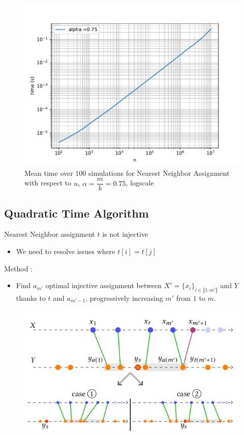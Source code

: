 \documentclass[11pt]{beamer}
\begin{document}
\begin{frame}
\begin{figure}[H]
\centering
\includegraphics[scale=0.48]{t_time.pdf}
\caption{Mean time over $100$ simulations for Nearest Neighbor Assignment with respect to $n$, $\alpha=\dfrac{m}{b}=0.75$, logscale}\label{t_time}
\end{figure}
\end{frame}

\subsection{Quadratic Time Algorithm}

\begin{frame}

Nearest Neighbor assignment $t$ is {\color{red}not injective} 
\begin{itemize}
\item We need to resolve issues where $t[i]=t[j]$
\end{itemize} 
Method : 
\begin{itemize}
\item Find $a_{m'}$ optimal injective assignment between $X' = \{x_i \}_{i \in \llbracket 1;m' \rrbracket} $ and $Y$ thanks to $t$ and $a_{m'-1}$, progressively increasing $m'$ from $1$ to $m$. 
\end{itemize}

\begin{figure}
\includegraphics[scale=0.4]{quad_cases.png}
\end{figure}

\end{frame}
\end{document}
